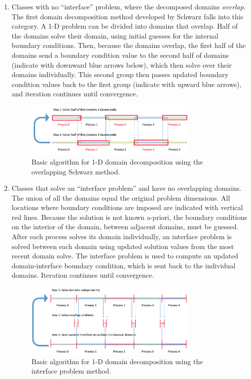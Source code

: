 \documentclass[10pt]{article}
\begin{document}
\begin{enumerate}
\item Classes with no ``interface'' problem, where the decomposed domains {\it overlap}. The first domain decomposition method developed by Schwarz falls into this category. A 1-D problem can be divided into domains that overlap. Half of the domains solve their domain, using initial guesses for the internal boundary conditions. Then, because the domains overlap, the first half of the domains send a boundary condition value to the second half of domains (indicate with downward blue arrows below), which then solve over their domains individually. This second group then passes updated boundary condition values back to the first group (indicate with upward blue arrows), and iteration continues until convergence. 

\begin{figure}[H]
\centering
\includegraphics[width=0.8\textwidth]{../figures/1D-schwarz2.png}
\caption{Basic algorithm for 1-D domain decomposition using the overlapping Schwarz method.}
\end{figure}

\item Classes that solve an ``interface problem'' and have no overlapping domains. The union of all the domains equal the original problem dimensions. All locations where boundary conditions are imposed are indicated with vertical red lines. Because the solution is not known a-priori, the boundary conditions on the interior of the domain, between adjacent domains, must be guessed. After each process solves its domain individually, an interface problem is solved between each domain using updated solution values from the most recent domain solve. The interface problem is used to compute an updated domain-interface boundary condition, which is sent back to the individual domains. Iteration continues until convergence.

\begin{figure}[H]
\centering
\includegraphics[width=0.8\textwidth]{../figures/1D-dd2.png}
\caption{Basic algorithm for 1-D domain decomposition using the interface problem method.}
\end{figure}


\end{enumerate}
\end{document}
